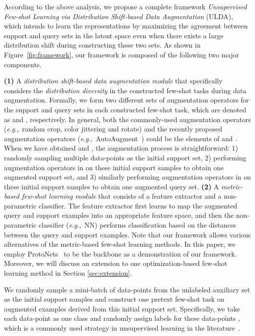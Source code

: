 \documentclass[letterpaper]{article} \usepackage{aaai21}  \usepackage{times}  \usepackage{helvet} \usepackage{courier}  \usepackage[hyphens]{url}  \usepackage{graphicx} \urlstyle{rm} \def\UrlFont{\rm}  \usepackage{natbib}  \usepackage{caption} \usepackage{url}
\newcommand{\eg}{\textit{e}.\textit{g}.,}
\begin{document}
\iffalse
According to the above analysis, we propose a complete framework \emph{Unsupervised Few-shot Learning via Distribution Shift-based Data Augmentation} (ULDA), which intends to learn the representations by maximizing the agreement between support and query sets in the latent space even when there exists a large distribution shift during constructing these two sets. As shown in Figure~\ref{fig:framework}, our framework is composed of the following two major components.

\textbf{(1)} A \emph{distribution shift-based data augmentation module} that specifically considers the \emph{distribution diversity} in the constructed few-shot tasks during data augmentation. Formally, we form two different sets of augmentation operators for the support and query sets in each constructed few-shot task, which are denoted as  and , respectively. In general, both the commonly-used augmentation operators (\eg~random crop, color jittering and rotate) and the recently proposed augmentation operators (\eg~AutoAugment~\cite{Cubuk2019CVPR}) could be the elements of  and . When we have obtained  and , the augmentation process is straightforward: 1) randomly sampling multiple data-points as the initial support set, 2) performing augmentation operators in  on these initial support samples to obtain one augmented support set, and 3) similarly performing augmentation operators in  on these initial support samples to obtain one augmented query set.
\textbf{(2)} A \emph{metric-based few-shot learning module} that consists of a feature extractor  and a non-parametric classifier. The feature extractor  first learns to map the augmented query and support examples into an appropriate feature space, and then the non-parametric classifier (\eg~NN) performs classification based on the distances between the query and support examples. Note that our framework allows various alternatives of the metric-based few-shot learning methods. In this paper, we employ ProtoNets~\cite{Snell2016NIPS} to be the backbone as a demonstration of our framework. Moreover, we will discuss an extension to one optimization-based few-shot learning method in Section \ref{sec:extension}.


We randomly sample a mini-batch of  data-points  from the unlabeled auxiliary set  as the initial support samples and construct one pretext few-shot task on augmented examples derived from this initial support set. Specifically, we take each data-point as one class and randomly assign labels for these data-points , which is a commonly used strategy in unsupervised learning in the literature~\cite{Wu2018CVPR,He2019MoCo}.
\end{document}
